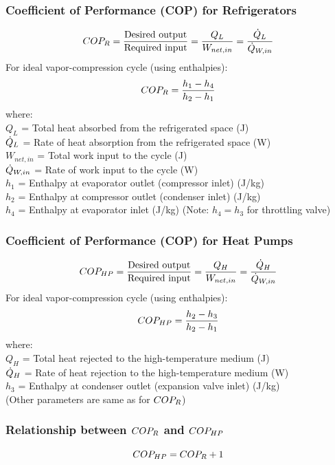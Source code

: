 \subsubsection*{Coefficient of Performance (COP) for Refrigerators}
\begin{equation}
    COP_R = \frac{\text{Desired output}}{\text{Required input}} = \frac{Q_L}{W_{net,in}} = \frac{\dot{Q}_L}{\dot{Q}_{W,in}}
\end{equation}
For ideal vapor-compression cycle (using enthalpies):
\begin{equation}
    COP_R = \frac{h_1 - h_4}{h_2 - h_1}
\end{equation}
where: \\
$Q_L$ = Total heat absorbed from the refrigerated space (J) \\
$\dot{Q}_L$ = Rate of heat absorption from the refrigerated space (W) \\
$W_{net,in}$ = Total work input to the cycle (J) \\
$\dot{Q}_{W,in}$ = Rate of work input to the cycle (W) \\
$h_1$ = Enthalpy at evaporator outlet (compressor inlet) (J/kg) \\
$h_2$ = Enthalpy at compressor outlet (condenser inlet) (J/kg) \\
$h_4$ = Enthalpy at evaporator inlet (J/kg) (Note: $h_4 = h_3$ for throttling valve)

\subsubsection*{Coefficient of Performance (COP) for Heat Pumps}
\begin{equation}
    COP_{HP} = \frac{\text{Desired output}}{\text{Required input}} = \frac{Q_H}{W_{net,in}} = \frac{\dot{Q}_H}{\dot{Q}_{W,in}}
\end{equation}
For ideal vapor-compression cycle (using enthalpies):
\begin{equation}
    COP_{HP} = \frac{h_2 - h_3}{h_2 - h_1}
\end{equation}
where: \\
$Q_H$ = Total heat rejected to the high-temperature medium (J) \\
$\dot{Q}_H$ = Rate of heat rejection to the high-temperature medium (W) \\
$h_3$ = Enthalpy at condenser outlet (expansion valve inlet) (J/kg) \\
(Other parameters are same as for $COP_R$)

\subsubsection*{Relationship between $COP_R$ and $COP_{HP}$}
\begin{equation}
    COP_{HP} = COP_R + 1
\end{equation}

